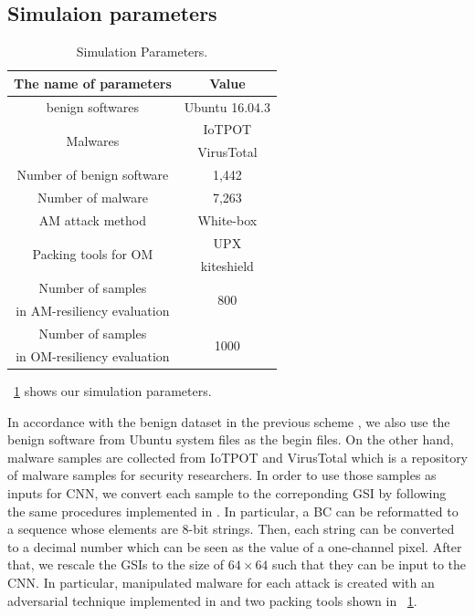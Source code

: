 \documentclass{ieeeaccess}
\begin{document}
\subsection{Simulaion parameters}
\begin{table}[h]
	\begin{center}
		\caption{Simulation Parameters.}
		\label{tab:simulation_parameters} 
		\begin{tabular}{|c|c|} \hline
			The name of parameters & Value\\ \hline \hline
			benign softwares & Ubuntu 16.04.3\cite{ubuntu}\\ \hline
			\multirow{2}{*}{\hfill Malwares  \hfill} & IoTPOT\cite{iotpot} \\ 
																							 & VirusTotal\cite{virustotal}\\ \hline
			Number of benign software  & 1,442 \\  \hline
			Number of malware  &  7,263 \\ \hline
			AM attack method & White-box \cite{am, yamafumi} \\ \hline
			\multirow{2}{*}{\hfill Packing tools for OM  \hfill} & UPX\cite{upx} \\ & kiteshield\cite{kiteshield} \\ \hline
			Number of samples  & \multirow{2}{*}{\hfill 800 \hfill} \\  
			in AM-resiliency evaluation & \\ \hline 
			Number of samples  & \multirow{2}{*}{\hfill 1000 \hfill} \\  
			in OM-resiliency evaluation & \\ \hline 
		\end{tabular}
	\end{center}
\end{table} 

\tablename~\ref{tab:simulation_parameters} shows our simulation parameters.

In accordance with the benign dataset in the previous scheme \cite{previous}, we also use the benign software from Ubuntu system files \cite{ubuntu} as the begin files.
On the other hand, malware samples are collected from IoTPOT \cite{iotpot} and VirusTotal \cite{virustotal} which is a repository of malware samples for security researchers.
In order to use those samples as inputs for CNN, we convert each sample to the correponding GSI by following the same procedures implemented in \cite{previous}.
In particular, a BC can be reformatted to a sequence whose elements are 8-bit strings.
Then, each string can be converted to a decimal number which can be seen as the value of a one-channel pixel.
After that, we rescale the GSIs to the size of $64\times 64$ such that they can be input to the CNN.
In particular, manipulated malware for each attack is created with an adversarial technique implemented in \cite{am, yamafumi} and two packing tools \cite{upx, kiteshield} shown in \tablename~\ref{tab:simulation_parameters}.
\end{document}
